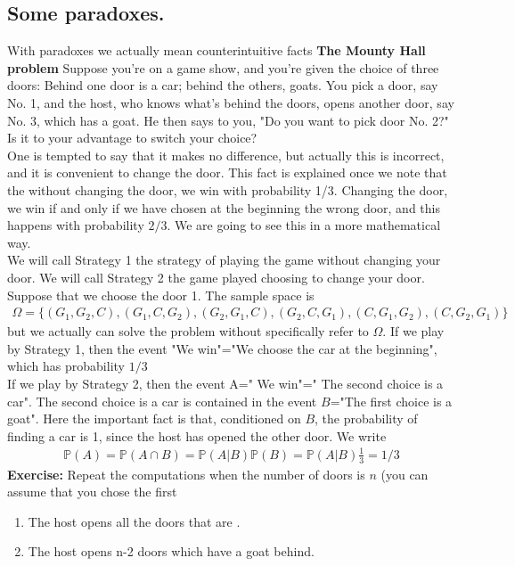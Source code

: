 \documentclass[reqno]{amsart}
\newcommand{\<}{{\langle \!\! \langle}}
\renewcommand{\>}{{\rangle \!\! \rangle}}
\newcommand{\bel}[2]{\begin{equation} \label{#1} \begin{split} #2
 					\end{split} \end{equation}}
\begin{document}
\subsection{Some paradoxes.}
With paradoxes we actually mean counterintuitive facts 
\textbf{The Mounty Hall problem}
Suppose you're on a game show, and you're given the choice of three doors: Behind one door is a car; behind the others, goats. You pick a door, say No. 1, and the host, who knows what's behind the doors, opens another door, say No. 3, which has a goat. He then says to you, "Do you want to pick door No. 2?" Is it to your advantage to switch your choice? \\
One is tempted to say that it makes no difference, but actually this is incorrect, and it is convenient to change the door. This fact is explained once we note that the without changing the door, we win with probability 1/3. Changing the door, we win if and only if we have chosen at the beginning the wrong door, and this happens with probability $2/3$. We are going to see this in a more mathematical way. \\
We will call Strategy 1 the strategy of playing the game without changing your door. We will call Strategy 2 the game played choosing to change your door. \\
Suppose that we choose the door 1. The sample space is \bel{}{\Omega=\{(G_1,G_2,C),(G_1,C,G_2),(G_2,G_1,C),(G_2,C,G_1),(C,G_1,G_2),(C, G_2,G_1)\}}
but we actually can solve the problem without specifically refer to $\Omega$.
If we play by Strategy 1, then the event "We win"="We choose the car at the beginning", which has probability $1/3$\\
If we play by Strategy 2, then the event A=" We win"=" The second choice is a car". The second choice is a car is contained in the event $B$="The first choice is a goat". Here the important fact is that, conditioned on $B$, the probability of finding a car is 1, since the host has opened the other door. We write 
\bel{}{\mathbb{P}(A)=\mathbb{P}(A\cap B)=\mathbb{P}(A|B)\mathbb{P}(B)=\mathbb{P}(A|B) \frac{1}{3}=1/3}
\textbf{Exercise:} Repeat the computations when the number of doors is $n$ (you can assume that you chose the first
\begin{enumerate}
    \item The host opens all the doors that are .\\
    
    \item The host opens n-2 doors which have a goat behind.
\end{enumerate}
\end{document}
